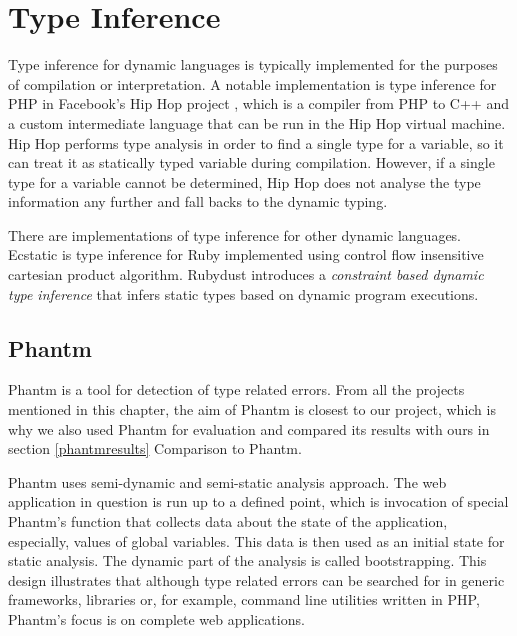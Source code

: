     \section{Type Inference}
    
    Type inference for dynamic languages is typically implemented 
    for the purposes of compilation or interpretation. A notable implementation 
    is type inference for PHP in Facebook's Hip Hop project \cite{zhao2012hiphop}, 
    which is a compiler from PHP to C++ and a custom intermediate language 
    that can be run in the Hip Hop virtual machine. Hip Hop performs type 
    analysis in order to find a single type for a variable, so it can treat 
    it as statically typed variable during compilation. However, if a single 
    type for a variable cannot be determined, Hip Hop does not analyse 
    the type information any further and fall backs to the dynamic typing.    
        
    There are implementations of type inference for other dynamic languages. 
    Ecstatic\cite{madsen2007ecstatic} is type inference for Ruby 
    implemented using control flow insensitive cartesian product algorithm. 
    Rubydust\cite{an2011dynamic} introduces a \emph{constraint based dynamic 
    type inference} that infers static types based on dynamic program 
    executions.

    \subsection{Phantm}
    
    Phantm\cite{kneuss2010phantm} is a tool for detection of type related 
    errors. From all the projects mentioned in this chapter, the aim of 
    Phantm is closest to our project, which is why we also used Phantm 
    for evaluation and compared its results with ours in 
    section \ref{phantmresults} Comparison to Phantm.
    
    Phantm uses semi-dynamic and semi-static analysis approach. The web 
    application in question is run up to a defined point, which is invocation 
    of special Phantm's function that collects data about the state of the application, 
    especially, values of global variables. This data is then used as an initial 
    state for static analysis. The dynamic part of the analysis is called bootstrapping. 
    This design illustrates that although type related errors can be searched for 
    in generic frameworks, libraries or, for example, command line utilities 
    written in PHP, Phantm's focus is on complete web applications.
    
    
    
    
    
    
    
    
    
